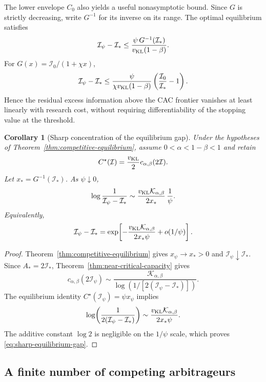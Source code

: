 \documentclass[11pt]{article}
\numberwithin{equation}{section}
\theoremstyle{plain}
\newtheorem{corollary}[theorem]{Corollary}
\theoremstyle{definition}
\theoremstyle{remark}
\begin{document}
The lower envelope $C_0$ also yields a useful nonasymptotic bound.  Since $G$ is strictly decreasing, write $G^{-1}$ for its inverse on its range. The optimal equilibrium satisfies
\[
\mathcal I_\psi-\mathcal I_*
\le
\frac{\psi\,G^{-1}(\mathcal I_*)}{{v_{\rm KL}}(1-\beta)}.
\]
For \(G(x)=\mathcal I_0/(1+\chi x)\),
\[
\mathcal I_\psi-\mathcal I_*
\le
\frac{\psi}{\chi {v_{\rm KL}}(1-\beta)}
\left(\frac{\mathcal I_0}{\mathcal I_*}-1\right).
\]
Hence the residual excess information above the CAC frontier vanishes at least
linearly with research cost, without requiring differentiability of the
stopping value at the threshold.

\begin{corollary}[Sharp concentration of the equilibrium gap]\label{cor:near-critical-equilibrium}
Under the hypotheses of Theorem~\ref{thm:competitive-equilibrium}, assume $0<\alpha<1-\beta<1$ and retain
\[
C^\star(\mathcal I)=\frac {v_{\rm KL}}2c_{\alpha,\beta}(2\mathcal I).
\]
Let $x_*=G^{-1}(\mathcal I_*)$.  As $\psi\downarrow0$,
\begin{equation}\label{eq:sharp-equilibrium-gap}
\log\frac1{\mathcal I_\psi-\mathcal I_*}
\sim
\frac{{v_{\rm KL}}\mathcal K_{\alpha,\beta}}{2x_*}\,\frac1\psi.
\end{equation}
Equivalently,
\[
\mathcal I_\psi-\mathcal I_*
=
\exp\!\left[
-\frac{{v_{\rm KL}}\mathcal K_{\alpha,\beta}}{2x_*\psi}
+o(1/\psi)
\right].
\]
\end{corollary}

\begin{proof}
Theorem~\ref{thm:competitive-equilibrium} gives $x_\psi\to x_*>0$ and $\mathcal I_\psi\downarrow\mathcal I_*$. Since $A_*=2\mathcal I_*$, Theorem~\ref{thm:near-critical-capacity} gives
\[
c_{\alpha,\beta}(2\mathcal I_\psi)
\sim
\frac{\mathcal K_{\alpha,\beta}}
{\log\!\left(1/[2(\mathcal I_\psi-\mathcal I_*)]\right)}.
\]
The equilibrium identity $C^\star(\mathcal I_\psi)=\psi x_\psi$ implies
\[
\log\!\left(\frac1{2(\mathcal I_\psi-\mathcal I_*)}\right)
\sim
\frac{{v_{\rm KL}}\mathcal K_{\alpha,\beta}}{2x_*\psi}.
\]
The additive constant $\log2$ is negligible on the $1/\psi$ scale, which proves \eqref{eq:sharp-equilibrium-gap}.
\end{proof}

\subsection{A finite number of competing arbitrageurs}
\end{document}
